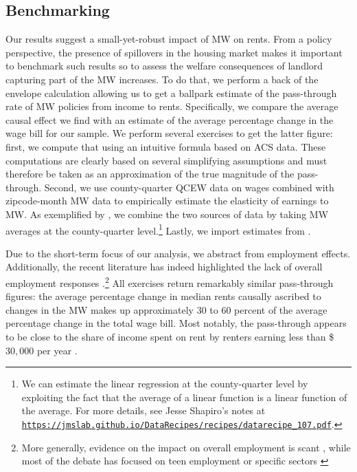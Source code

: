 

\subsection{Benchmarking}

Our results suggest a small-yet-robust impact of MW on rents. From a policy perspective, 
the presence of spillovers in the housing market makes it important to benchmark such results 
so to assess the welfare consequences of landlord capturing part of the MW increases. 
To do that, we perform a back of the envelope calculation allowing us to get a ballpark estimate 
of the pass-through rate of MW policies from income to rents. Specifically, we compare the average 
causal effect we find with an estimate of the average percentage change in the wage 
bill for our sample. We perform several exercises to get the latter figure: first, we 
compute that using an intuitive formula based on ACS data. These computations are 
clearly based on several simplifying assumptions and must therefore be taken as an approximation 
of the true magnitude of the pass-through. Second, we use county-quarter QCEW data on wages 
combined with zipcode-month MW data to empirically estimate the elasticity of earnings to MW. 
As exemplified by \textcite{gentzkow2015newspapers}, we combine the two sources of data by 
taking MW averages at the county-quarter level.\footnote{We can estimate the linear 
	regression at the county-quarter level by exploiting the fact that the average of a linear 
	function is a linear function of the average. For more details, see Jesse Shapiro's notes at \href{https://jmslab.github.io/DataRecipes/recipes/datarecipe_107.pdf}{\texttt{https://jmslab.github.io/DataRecipes/recipes/datarecipe\_107.pdf}}.} 
Lastly, we import estimates from \textcite{CegnizEtAl2019}. 

Due to the short-term focus of our analysis, we abstract from employment effects. Additionally, 
the recent literature has indeed highlighted the lack of overall employment responses 
\parencite{CegnizEtAl2019}.\footnote{More generally, evidence on the impact on overall 
	employment is scant \parencite{dube2019impacts}, while most of the debate has focused on 
	teen employment \parencite{card1992using, allegretto2017credible} or specific sectors 
	\parencite{katz1992effect, card2000minimum, dube2010minimum}} All exercises return 
remarkably similar pass-through figures: the average percentage change in median rents causally 
ascribed to changes in the MW makes up approximately $30$ to $60$ percent of the average 
percentage change in the total wage bill. Most notably, the pass-through appears to be close 
to the share of income spent on rent by renters earning less than \$$30,000$ per 
year \parencite{fernald2020americas}.

